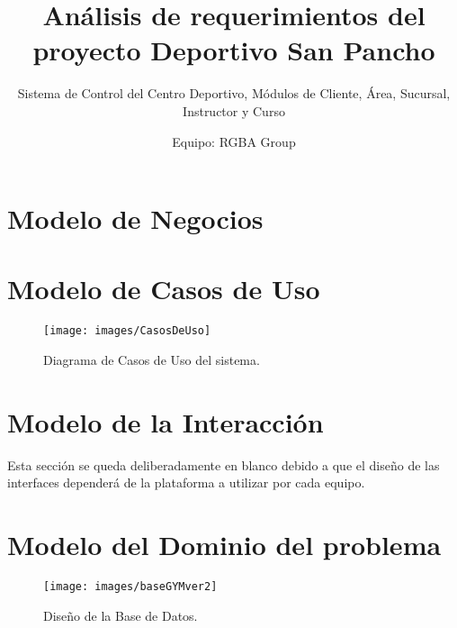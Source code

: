 \documentclass[oneside,10pt]{book}
\title{Análisis de requerimientos del proyecto Deportivo San Pancho}
\subtitle{Sistema de Control del Centro Deportivo, Módulos de Cliente, Área, Sucursal, Instructor y Curso}
\author{Equipo: RGBA Group}
\begin{document}
\maketitle
\thispagestyle{empty}

\frontmatter
\tableofcontents

\mainmatter

\chapter{Modelo de Negocios}


\chapter{Modelo de Casos de Uso}

\begin{figure}[htbp!]
		\centering
			\texttt{[image: images/CasosDeUso]}
		\caption{Diagrama de Casos de Uso del sistema.}
	\end{figure}
	

\chapter{Modelo de la Interacción}

{\color{UCInterfaceColor} 
	Esta sección se queda deliberadamente en blanco debido a que el diseño de las interfaces dependerá de la plataforma a utilizar por cada equipo.\\	
}


\chapter{Modelo del Dominio del problema}

	\begin{figure}[htbp!]
		\centering
			\texttt{[image: images/baseGYMver2]}
		\caption{Diseño de la Base de Datos.}
	\end{figure}
	
\end{document}
